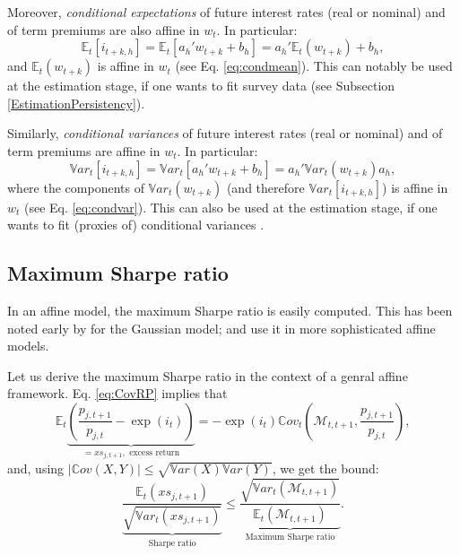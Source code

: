 \documentclass[
  12pt,
]{book}
\theoremstyle{definition}
\theoremstyle{definition}
\theoremstyle{definition}
\theoremstyle{definition}
\theoremstyle{remark}
\begin{document}
Moreover, \emph{conditional expectations} of future interest rates (real or nominal) and of term premiums are also affine in \(w_t\). In particular:
\begin{equation}
\mathbb{E}_t[i_{t+k,h}] = \mathbb{E}_t[{a_h}'w_{t+k} + b_h] = {a_h}'\mathbb{E}_t(w_{t+k}) + b_h,\label{eq:condmeanRth}
\end{equation}
and \(\mathbb{E}_t(w_{t+k})\) is affine in \(w_t\) (see Eq. \eqref{eq:condmean}). This can notably be used at the estimation stage, if one wants to fit survey data (see Subsection \ref{EstimationPersistency}).

Similarly, \emph{conditional variances} of future interest rates (real or nominal) and of term premiums are affine in \(w_t\). In particular:
\begin{equation}
\mathbb{V}ar_t[i_{t+k,h}] = \mathbb{V}ar_t[{a_h}'w_{t+k} + b_h] = {a_h}'\mathbb{V}ar_t(w_{t+k})a_h,\label{eq:condvarRth}
\end{equation}
where the components of \(\mathbb{V}ar_t(w_{t+k})\) (and therefore \(\mathbb{V}ar_t[i_{t+k,h}]\)) is affine in \(w_t\) (see Eq. \eqref{eq:condvar}). This can also be used at the estimation stage, if one wants to fit (proxies of) conditional variances \citep{zarg_2017}.

\hypertarget{maximum-sharpe-ratio}{%
\subsection{Maximum Sharpe ratio}\label{maximum-sharpe-ratio}}

In an affine model, the maximum Sharpe ratio is easily computed. This has been noted early by \citet{Duffee_2010} for the Gaussian model; \citet{Gourieroux_Monfort_Mouabbi_Renne_2021} and \citet{Pallara_Renne_2023} use it in more sophisticated affine models.

Let us derive the maximum Sharpe ratio in the context of a genral affine framework. Eq. \eqref{eq:CovRP} implies that
\[
\mathbb{E}_t\underbrace{\left(\frac{p_{j,t+1}}{p_{j,t}} - \exp(i_t)\right)}_{=xs_{j,t+1},\mbox{ excess return}} =  - \exp(i_t) \mathbb{C}ov_t\left(\mathcal{M}_{t,t+1},\frac{p_{j,t+1}}{p_{j,t}}\right),
\]
and, using \(|\mathbb{C}ov(X,Y)| \le \sqrt{\mathbb{V}ar(X)\mathbb{V}ar(Y)}\), we get the \citet{Hansen_Jagannathan_1991} bound:
\begin{equation}
\underbrace{\frac{\mathbb{E}_t(xs_{j,t+1})}{\sqrt{\mathbb{V}ar_t(xs_{j,t+1})}}}_{\mbox{Sharpe ratio}} \le \underbrace{\frac{\sqrt{\mathbb{V}ar_t(\mathcal{M}_{t,t+1})}}{\mathbb{E}_t(\mathcal{M}_{t,t+1})}}_{\mbox{Maximum Sharpe ratio}}.
\end{equation}
\end{document}
